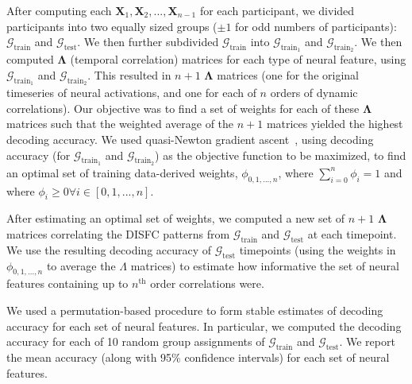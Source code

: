 \documentclass[english]{article}
\begin{document}
After computing each
$\mathbf{X}_1, \mathbf{X}_2, ..., \mathbf{X}_{n-1}$ for each
participant, we divided participants into two equally sized groups
($\pm 1$ for odd numbers of participants):
$\mathcal{G}_{\mathrm{train}}$ and $\mathcal{G}_{\mathrm{test}}$.  We
then further subdivided $\mathcal{G}_{\mathrm{train}}$ into
$\mathcal{G}_{\mathrm{train}_1}$ and $\mathcal{G}_{\mathrm{train}_2}$.
We then computed $\mathbf{\Lambda}$ (temporal correlation) matrices
for each type of neural feature, using
$\mathcal{G}_{\mathrm{train}_1}$ and $\mathcal{G}_{\mathrm{train}_2}$.
This resulted in $n+1$ $\mathbf{\Lambda}$ matrices (one for the
original timeseries of neural activations, and one for each of $n$
orders of dynamic correlations).  Our objective was to find a set of
weights for each of these $\mathbf{\Lambda}$ matrices such that the
weighted average of the $n+1$ matrices yielded the highest decoding
accuracy.  We used quasi-Newton gradient ascent~\cite{NoceWrig06},
using decoding accuracy (for $\mathcal{G}_{\mathrm{train}_1}$ and
$\mathcal{G}_{\mathrm{train}_2}$) as the objective function to be
maximized, to find an optimal set of training data-derived weights,
$\phi_{0, 1, ..., n}$, where $\sum_{i=0}^n \phi_i = 1$ and where
$\phi_i \geq 0 \forall i \in \left[0, 1, ..., n\right]$.

After estimating an optimal set of weights, we computed a new set of
$n + 1$ $\mathbf{\Lambda}$ matrices correlating the DISFC patterns
from $\mathcal{G}_{\mathrm{train}}$ and $\mathcal{G}_{\mathrm{test}}$
at each timepoint.  We use the resulting decoding accuracy of
$\mathcal{G}_{\mathrm{test}}$ timepoints (using the weights in
$\phi_{0, 1, ..., n}$ to average the $\Lambda$ matrices) to estimate how informative
the set of neural features containing up to $n^\mathrm{th}$ order
correlations were.

We used a permutation-based procedure to form stable estimates of
decoding accuracy for each set of neural features.  In particular, we
computed the decoding accuracy for each of 10 random group assignments of
$\mathcal{G}_{\mathrm{train}}$ and $\mathcal{G}_{\mathrm{test}}$.  We
report the mean accuracy (along with 95\% confidence intervals) for each set
of neural features.
\end{document}
